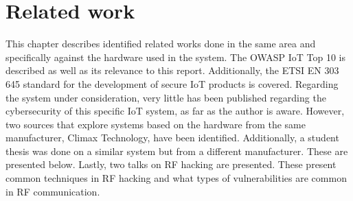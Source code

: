 \chapter{Related work} \label{ch:related-work}
This chapter describes identified related works done in the same area and specifically against the hardware used in the system. The OWASP IoT Top 10 is described as well as its relevance to this report. Additionally, the ETSI EN 303 645 standard for the development of secure IoT products is covered. Regarding the system under consideration, very little has been published regarding the cybersecurity of this specific IoT system, as far as the author is aware. However, two sources that explore systems based on the hardware from the same manufacturer, Climax Technology, have been identified. Additionally, a student thesis was done on a similar system but from a different manufacturer. These are presented below. Lastly, two talks on RF hacking are presented. These present common techniques in RF hacking and what types of vulnerabilities are common in RF communication.

